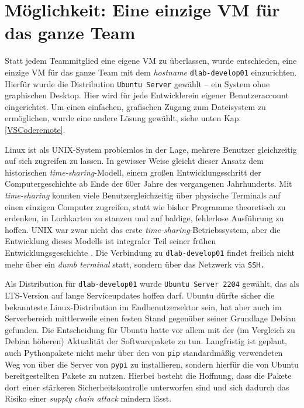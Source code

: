 \section{Möglichkeit: Eine einzige VM für das ganze Team}
Statt jedem Teammitglied eine eigene VM zu überlassen, wurde entschieden, eine einzige VM für das ganze Team mit dem \textit{hostname} \texttt{dlab-develop01} einzurichten. Hierfür wurde die Distribution \texttt{Ubuntu Server} gewählt -- ein System ohne graphischen Desktop.
Hier wird für jede Entwickler\ggpin ein eigener Benutzeraccount eingerichtet.
Um einen einfachen, grafischen Zugang zum Dateisystem zu ermöglichen, wurde eine andere Lösung gewählt, siehe unten Kap. \ref{VSCoderemote}.

Linux ist als UNIX-System problemlos in der Lage, mehrere Benutzer gleichzeitig auf sich zugreifen zu lassen. In gewisser Weise gleicht dieser Ansatz dem historischen \textit{time-sharing}-Modell, einem großen Entwicklungsschritt der Computergeschichte ab Ende der 60er Jahre des vergangenen Jahrhunderts.
Mit \textit{time-sharing} konnten viele Benutzer\ggpinnen gleichzeitig über physische Terminals auf einen einzigen Computer zugreifen, statt wie bisher Programme theoretisch zu erdenken, in Lochkarten zu stanzen und auf baldige, fehlerlose Ausführung zu hoffen.
UNIX war zwar nicht das erste \textit{time-sharing}-Betriebssystem, aber die Entwicklung dieses Modells ist integraler Teil seiner frühen Entwicklungsgeschichte  \cite[30-31]{KernighanUnixHistory2020}.
Die Verbindung zu \texttt{dlab-develop01} findet freilich nicht mehr über ein \textit{dumb terminal} statt, sondern über das Netzwerk via \texttt{SSH.}

Als Distribution für \texttt{dlab-develop01} wurde \texttt{Ubuntu Server 2204} gewählt, das als \acs{LTS}-Version auf lange Serviceupdates hoffen darf.
Ubuntu dürfte sicher die bekannteste Linux-Distribution im Endbenutzersektor sein, hat aber auch im Serverbereich mittlerweile einen festen Stand gegenüber seiner Grundlage Debian gefunden.
Die Entscheidung für Ubuntu hatte vor allem mit der (im Vergleich zu Debian höheren) Aktualität der Softwarepakete zu tun.
Langfristig ist geplant, auch Pythonpakete nicht mehr über den von \texttt{\acs{pip}} standardmäßig verwendeten Weg von über die Server von \texttt{\acs{pypi}} zu installieren, sondern hierfür die von Ubuntu bereitgestellten Pakete zu nutzen.
Hierbei besteht die Hoffnung, dass die Pakete dort einer stärkeren Sicherheitskontrolle unterworfen sind und sich dadurch das Risiko einer \textit{supply chain attack} mindern lässt.

